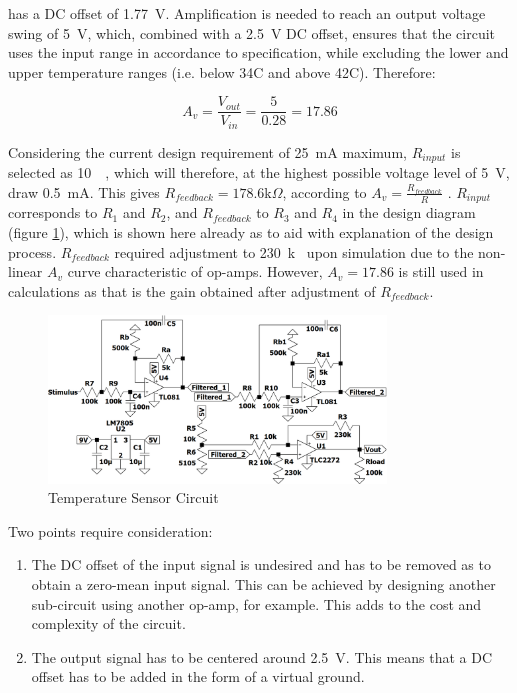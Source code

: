 has a DC offset of \SI{1.77}{\volt}. Amplification is needed to reach an output voltage swing of \SI{5}{\volt}, which, combined with a \SI{2.5}{V} DC offset, ensures that the circuit uses the input range in accordance to specification, while excluding the lower and upper temperature ranges (i.e. below 34\degree C and above 42\degree C). Therefore:

$$A_v = \frac{V_{out}}{V_{in}} = \frac{5}{0.28} = 17.86$$

Considering the current design requirement of \SI{25}{mA} maximum, $R_{input}$ is selected as \SI{10}{\kilo \Omega}, which will therefore, at the highest possible voltage level of \SI{5}{\volt}, draw \SI{0.5}{mA}. This gives $R_{feedback} = 178.6$k$\Omega$, according to $A_v = \frac{{R}_{feedback}}{R}$ \cite{opamp}. $R_{input}$ corresponds to $R_1$ and $R_2$, and $R_{feedback}$ to $R_{3}$ and $R_4$ in the design diagram (figure \ref{fig:final}), which is shown here already as to aid with explanation of the design process. $R_{feedback}$ required adjustment to \SI{230}{k\Omega} upon simulation due to the non-linear $A_v$ curve characteristic of op-amps. However, $A_{v} = 17.86$ is still used in calculations as that is the gain obtained after adjustment of $R_{feedback}$.

\begin{figure}[H]
    \centering
    \includegraphics[width = 0.8\textwidth]{Figures/final.png}
    \caption{Temperature Sensor Circuit}
    \label{fig:final}
\end{figure}

Two points require consideration: 
\begin{enumerate}
\item The DC offset of the input signal is undesired and has to be removed as to obtain a zero-mean input signal. This can be achieved by designing another sub-circuit using another op-amp, for example. This adds to the cost and complexity of the circuit.
\item The output signal has to be centered around \SI{2.5}{\volt}. This means that a DC offset has to be added in the form of a virtual ground.
\end{enumerate}

